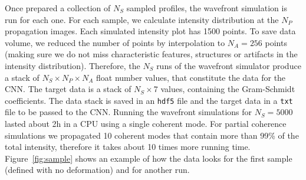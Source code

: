 \documentclass[preprint]{iucr}
\begin{document}
Once prepared a collection of $N_S$ sampled profiles, the wavefront simulation is run for each one. For each sample,  we calculate intensity distribution at the $N_P$ propagation images. Each simulated intensity plot has 1500 points. To save data volume, we reduced the number of points by interpolation to $N_A=256$ points (making sure we do not miss characteristic features, structures or artifacts in the intensity distribution). Therefore, the $N_S$ runs of the wavefront simulator produce a stack of $N_S \times N_P \times N_A$ float number values, that constitute the data for the CNN. The target data is a stack of $N_S \times 7$ values, containing the Gram-Schmidt coefficients. The data stack is saved in an \texttt{hdf5} file and the target data in a \texttt{txt} file to be passed to the CNN. Running the wavefront simulations for $N_S=5000$ lasted about 2h in a CPU using a single coherent mode. For partial coherence simulations we propagated 10 coherent modes that contain more than 99\% of the total intensity, therefore it takes about 10 times more running time. Figure~\ref{fig:sample} shows an example of how the data looks for the first sample (defined with no deformation) and for another run.
\end{document}
